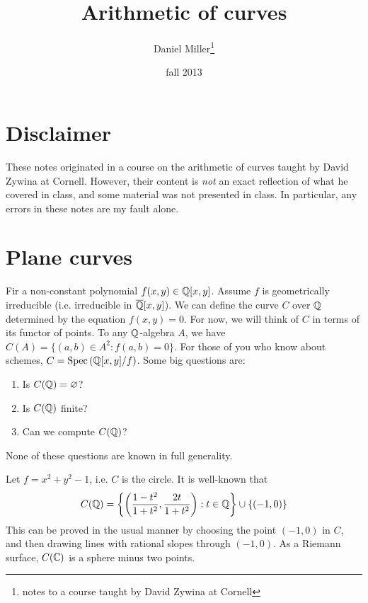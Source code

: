 \documentclass{article}
\title{Arithmetic of curves}
\author{Daniel Miller\thanks{notes to a course taught by David Zywina at Cornell}}
\date{fall 2013}
\begin{document}
\maketitle











\section*{Disclaimer}

These notes originated in a course on the arithmetic of curves taught by David 
Zywina at Cornell. However, their content is \emph{not} an exact reflection of 
what he covered in class, and some material was not presented in class. In 
particular, any errors in these notes are my fault alone. 










\section{Plane curves}

Fir a non-constant polynomial $f(x,y)\in\mathbb{Q}[x,y]$. Assume $f$ is 
geometrically irreducible (i.e. irreducible in $\overline{\mathbb{Q}}[x,y]$). 
We can define the curve $C$ over $\mathbb{Q}$ determined by the equation 
$f(x,y)=0$. For now, we will think of $C$ in terms of its functor of points. 
To any $\mathbb{Q}$-algebra $A$, we have $C(A)=\{(a,b)\in A^2:f(a,b)=0\}$. 
For those of you who know about schemes, 
$C=\operatorname{Spec}\left(\mathbb{Q}[x,y]/f\right)$. Some big questions are:
\begin{enumerate}
  \item Is $C(\mathbb{Q})=\varnothing$?
  \item Is $C(\mathbb{Q})$ finite?
  \item Can we compute $C(\mathbb{Q})$?
\end{enumerate}
None of these questions are known in full generality. 

\begin{example}
Let $f=x^2+y^2-1$, i.e. $C$ is the circle. It is well-known that 
\[
  C(\mathbb{Q})=\left\{\left(\frac{1-t^2}{1+t^2},\frac{2t}{1+t^2}\right):t\in\mathbb{Q}\right\}\cup \{(-1,0)\}
\]
This can be proved in the usual manner by choosing the point 
$(-1,0)$ in $C$, and then drawing lines with rational slopes through 
$(-1,0)$. As a Riemann surface, $C(\mathbb{C})$ is a sphere minus 
two points. 
\end{example}
\end{document}
